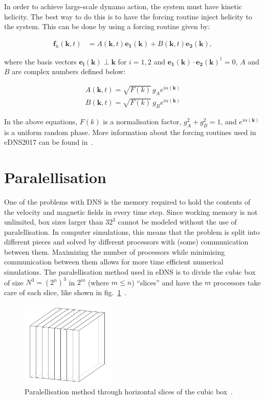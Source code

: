 \documentclass[12pt,a4paper]{report}
\begin{document}
In order to achieve large-scale dynamo action, the system must have kinetic helicity. The best way to do this is to have the forcing routine inject helicity to the system. This can be done by using a forcing routine given by:

\begin{align}
 \bm f_h(\bm k, t) &= A(\bm k, t) \bm{e_1}(\bm k) + B(\bm k, t) \bm{e_2}(\bm k), \nonumber
\end{align}

where the basis vectors $\bm{e_i}(\bm k) \perp \bm k$ for $i=1, 2$ and $\bm{e_1}(\bm k)\cdot \bm{e_2}(\bm k)^\dagger = 0$,  $A$ and $B$ are complex numbers defined below:

\begin{align}
 A(\bm k, t) = \sqrt{F(k)} \, g_A e^{i \alpha(\bm k)} \nonumber \\
 B(\bm k, t) = \sqrt{F(k)} \, g_B e^{i \alpha(\bm k)} \nonumber
\end{align}

In the above equations, $F(k)$ is a normalisation factor, $g_A^2+g_B^2=1$, and $e^{i\alpha(\bm k)}$ is a uniform random phase. More information about the forcing routines used in eDNS2017 can be found in~\cite{yoffe2013investigation, LinkmannMoritzFrederikLeon2016Spim}.

\section{Paralellisation}

One of the problems with DNS is the memory required to hold the contents of the velocity and magnetic fields in every time step. Since working memory is not unlimited, box sizes larger than $32^3$ cannot be modeled without the use of paralellisation. In computer simulations, this means that the problem is split into different pieces and solved by different processors with (some) communication between them. Maximizing the number of processors while minimising communication between them allows for more time efficient numerical simulations. The paralellisation method used in eDNS is to divide the cubic box of size $N^3 = (2^n)^3$ in $2^m$ (where $m\leq n$) ``slices'' and have the $m$ processors take care of each slice, like shown in fig.~\ref{fig4.1}~\cite{yoffe2013investigation}. 

\begin{figure}[!ht]
\centering
\includegraphics[width=0.4\textwidth]{img/slices}
\caption{Paralellisation method through horizontal slices of the cubic box~\cite{yoffe2013investigation}.}
\label{fig4.1}
\end{figure}
\end{document}
